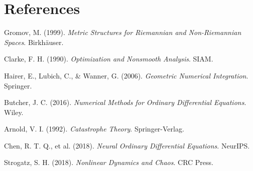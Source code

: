 \documentclass[12pt,a4paper]{article}
\begin{document}
\vfill

\section*{References}

\begin{enumerate}[leftmargin=1.5cm, label={[\arabic*]}]
\item Gromov, M. (1999). \textit{Metric Structures for Riemannian and Non-Riemannian Spaces}. Birkhäuser.

\item Clarke, F. H. (1990). \textit{Optimization and Nonsmooth Analysis}. SIAM.

\item Hairer, E., Lubich, C., \& Wanner, G. (2006). \textit{Geometric Numerical Integration}. Springer.

\item Butcher, J. C. (2016). \textit{Numerical Methods for Ordinary Differential Equations}. Wiley.

\item Arnold, V. I. (1992). \textit{Catastrophe Theory}. Springer-Verlag.

\item Chen, R. T. Q., et al. (2018). \textit{Neural Ordinary Differential Equations}. NeurIPS.

\item Strogatz, S. H. (2018). \textit{Nonlinear Dynamics and Chaos}. CRC Press.
\end{enumerate}
\end{document}
